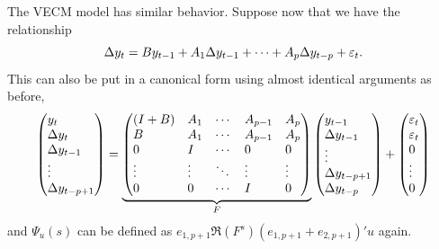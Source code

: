 \documentclass[12pt,fleqn]{article}
\begin{document}
The VECM model has similar behavior. Suppose now that we have the
relationship
\begin{equation*}
  \Delta y_t = B y_{t-1} + A_1 \Delta y_{t-1} + \cdots + A_p \Delta
  y_{t-p} + \varepsilon_t.
\end{equation*}
This can also be put in a canonical form using almost identical
arguments as before,
\begin{equation*}
  \begin{pmatrix*}[l]
    y_t \\ \Delta y_t \\ \Delta y_{t-1} \\ \vdots \\ \Delta y_{t-p+1}
  \end{pmatrix*}
  =
  \underbrace{\begin{pmatrix*}[l]
    (I + B) & A_1    & \cdots & A_{p-1} & A_p    \\
    B       & A_1    & \cdots & A_{p-1} & A_p    \\
    0       & I      & \cdots & 0       & 0      \\
    \vdots  & \vdots & \ddots & \vdots  & \vdots \\
    0       & 0      & \cdots & I       & 0
  \end{pmatrix*}}_F
  \begin{pmatrix*}[l]
    y_{t-1} \\ \Delta y_{t-1} \\ \vdots \\ \Delta y_{t-p+1} \\ \Delta y_{t-p}
  \end{pmatrix*}
  +
  \begin{pmatrix*}[l]
    \vep_t \\ \vep_t \\ 0 \\ \vdots \\ 0
  \end{pmatrix*}
\end{equation*}
and $\Psi_u(s)$ can be defined as
$e_{1,p+1} \Re(F^s) (e_{1,p+1} + e_{2,p+1})' u$ again.
\end{document}
